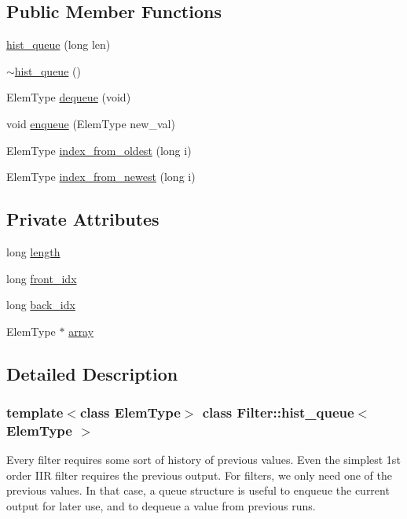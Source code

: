 \subsection*{Public Member Functions}
\begin{CompactItemize}
\item 
\hyperlink{classFilter_1_1hist__queue_a0}{hist\_\-queue} (long len)
\item 
\hyperlink{classFilter_1_1hist__queue_a1}{$\sim$hist\_\-queue} ()
\item 
Elem\-Type \hyperlink{classFilter_1_1hist__queue_a2}{dequeue} (void)
\item 
void \hyperlink{classFilter_1_1hist__queue_a3}{enqueue} (Elem\-Type new\_\-val)
\item 
Elem\-Type \hyperlink{classFilter_1_1hist__queue_a4}{index\_\-from\_\-oldest} (long i)
\item 
Elem\-Type \hyperlink{classFilter_1_1hist__queue_a5}{index\_\-from\_\-newest} (long i)
\end{CompactItemize}
\subsection*{Private Attributes}
\begin{CompactItemize}
\item 
long \hyperlink{classFilter_1_1hist__queue_r0}{length}
\item 
long \hyperlink{classFilter_1_1hist__queue_r1}{front\_\-idx}
\item 
long \hyperlink{classFilter_1_1hist__queue_r2}{back\_\-idx}
\item 
Elem\-Type $\ast$ \hyperlink{classFilter_1_1hist__queue_r3}{array}
\end{CompactItemize}


\subsection{Detailed Description}
\subsubsection*{template$<$class Elem\-Type$>$ class Filter::hist\_\-queue$<$ Elem\-Type $>$}

Every filter requires some sort of history of previous values. Even the simplest 1st order IIR filter requires the previous output. For filters, we only need one of the previous values. In that case, a queue structure is useful to enqueue the current output for later use, and to dequeue a value from previous runs.

